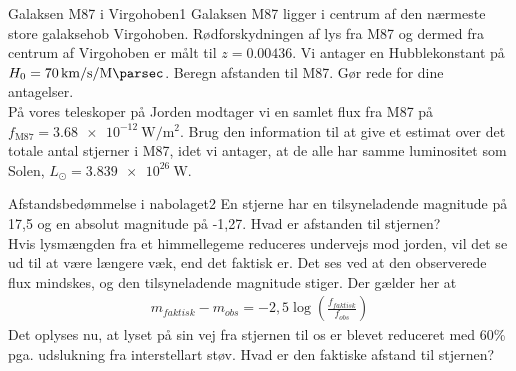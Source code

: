\begin{opgave}{Galaksen M87 i Virgohoben}{1}
	Galaksen M87 ligger i centrum af den nærmeste store
	galaksehob Virgohoben. Rødforskydningen af lys fra M87 og dermed fra centrum af
	Virgohoben er målt til $z = 0.00436$. Vi antager en Hubblekonstant på $H_0 = \SI{70}{\kilo\metre\per\second\per\mega\parsec}$.
	\opg Beregn afstanden til M87. Gør rede for dine antagelser. \\
	
	På vores teleskoper på Jorden modtager vi en samlet flux fra M87 på $f_\text{M87} = \SI{3.68e-12}{\watt\per\metre\squared}$.
	\opg Brug den information til at give et estimat over det totale antal stjerner i M87, idet vi
	antager, at de alle har samme luminositet som Solen, $L_\odot=\SI{3,839e26}{\watt}$.
\end{opgave}
\begin{opgave}{Afstandsbedømmelse i nabolaget}{2}
	En stjerne har en tilsyneladende magnitude på 17,5 og en absolut magnitude på -1,27.
	\opg Hvad er afstanden til stjernen? \\
	
	Hvis lysmængden fra et himmellegeme reduceres undervejs mod jorden, vil det se ud til at være længere væk, end det faktisk er. Det ses ved at den observerede flux mindskes, og den tilsyneladende magnitude stiger. Der gælder her at
	\begin{align*}
	m_{faktisk}-m_{obs} = -2,5 \log \left( \frac{f_{faktisk}}{f_{obs}} \right)
	\end{align*}
	\opg Det oplyses nu, at lyset på sin vej fra stjernen til os er blevet reduceret med 60\% pga. udslukning fra interstellart støv. Hvad er den faktiske afstand til stjernen?
\end{opgave}

